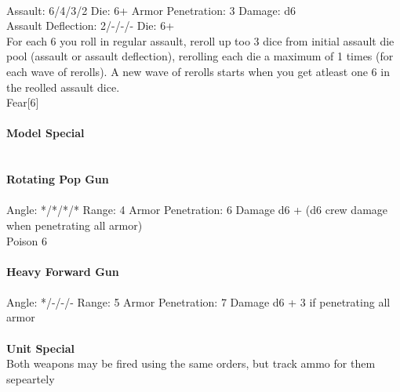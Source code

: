\ \\
Assault: 6/4/3/2 Die: 6+ Armor Penetration: 3 Damage: d6 \\
Assault Deflection: 2/-/-/- Die: 6+\\
\indent For each 6 you roll in regular assault, reroll up too 3 dice from initial assault die pool (assault or assault deflection), rerolling each die a maximum of 1 times (for each wave of rerolls). A new wave of rerolls starts when you get atleast one 6 in the reolled assault dice.\\ Fear[6] \\
\ \\
{\bf Model Special} \\

\ \\
\ \\
{\bf Rotating Pop Gun } \\
\ \\
Angle: */*/*/* Range: 4 Armor Penetration: 6 Damage d6 + (d6 crew damage when penetrating all armor) \\
\indent Poison 6 \\



\ \\
{\bf Heavy Forward Gun } \\
\ \\
Angle: */-/-/- Range: 5 Armor Penetration: 7 Damage d6 + 3 if penetrating all armor \\
\indent  \\






{\bf Unit Special} \\
Both weapons may be fired using the same orders, but track ammo for them sepeartely


